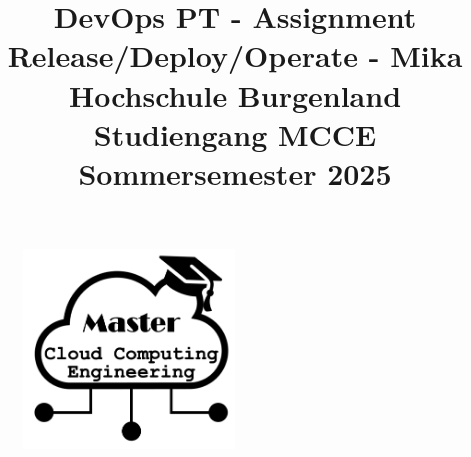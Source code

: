 \begin{figure} 
	\centering 
 \includegraphics[width=0.5\textwidth]{fig/Fig1.png}
	\label{fig:title-image}
\end{figure}

\title{
	DevOps PT - Assignment Release/Deploy/Operate - Mika \\ 
	\vspace{0.5cm} \large{Hochschule Burgenland} \\ 
 \large{Studiengang
	MCCE} \\ 
 \large{Sommersemester 2025}
}
